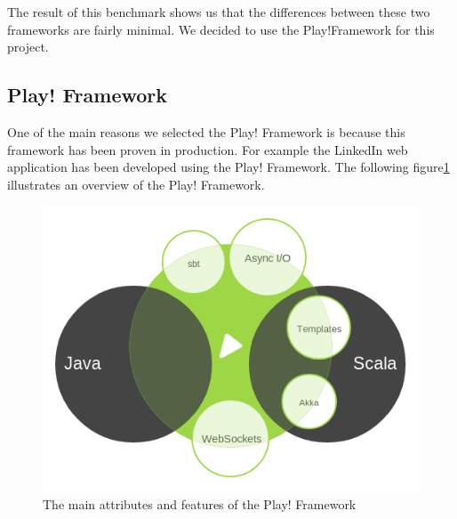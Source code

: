 The result of this benchmark shows us that the differences between these two frameworks are fairly minimal. We decided to use the Play!Framework for this project.
\newpage

\subsection{Play! Framework}
  One of the main reasons we selected the Play! Framework is because this framework has been proven in production. For example the LinkedIn web application has been developed using the Play! Framework. The following figure\ref{play} illustrates an overview of the Play! Framework.\\
\begin{figure}[h!]
\centering
\includegraphics[scale=0.5]{./img/play.png}
\caption{\small{The main attributes and features of the Play! Framework}}
\label{play}
\end{figure}
 
